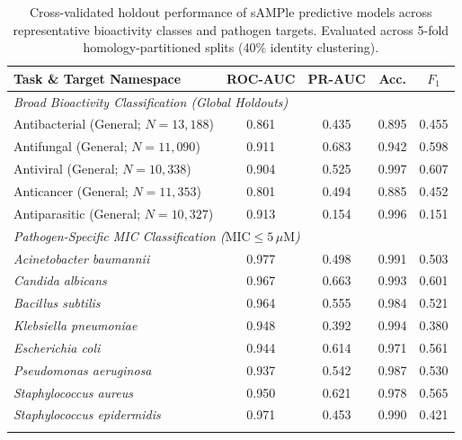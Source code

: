 \documentclass[unnumsec,webpdf,contemporary,large]{oup-authoring-template}%
\begin{document}
\begin{table}[!t]
\caption{Cross-validated holdout performance of sAMPle predictive models across representative bioactivity classes and pathogen targets. Evaluated across 5-fold homology-partitioned splits (40\% identity clustering).}\label{tab:models}
\begin{center}
\footnotesize
\begin{tabular*}{\columnwidth}{@{\extracolsep\fill}lcccc@{\extracolsep\fill}}
\toprule
Task \& Target Namespace & ROC-AUC & PR-AUC & Acc. & $F_1$ \\
\midrule
\multicolumn{5}{l}{\textit{Broad Bioactivity Classification (Global Holdouts)}} \\
Antibacterial (General; $N=13,188$) & 0.861 & 0.435 & 0.895 & 0.455 \\
Antifungal (General; $N=11,090$) & 0.911 & 0.683 & 0.942 & 0.598 \\
Antiviral (General; $N=10,338$) & 0.904 & 0.525 & 0.997 & 0.607 \\
Anticancer (General; $N=11,353$) & 0.801 & 0.494 & 0.885 & 0.452 \\
Antiparasitic (General; $N=10,327$) & 0.913 & 0.154 & 0.996 & 0.151 \\
\midrule
\multicolumn{5}{l}{\textit{Pathogen-Specific MIC Classification ($\text{MIC} \le 5\,\mu\text{M}$)}} \\
\textit{Acinetobacter baumannii} & 0.977 & 0.498 & 0.991 & 0.503 \\
\textit{Candida albicans} & 0.967 & 0.663 & 0.993 & 0.601 \\
\textit{Bacillus subtilis} & 0.964 & 0.555 & 0.984 & 0.521 \\
\textit{Klebsiella pneumoniae} & 0.948 & 0.392 & 0.994 & 0.380 \\
\textit{Escherichia coli} & 0.944 & 0.614 & 0.971 & 0.561 \\
\textit{Pseudomonas aeruginosa} & 0.937 & 0.542 & 0.987 & 0.530 \\
\textit{Staphylococcus aureus} & 0.950 & 0.621 & 0.978 & 0.565 \\
\textit{Staphylococcus epidermidis} & 0.971 & 0.453 & 0.990 & 0.421 \\
\botrule
\end{tabular*}
\end{center}
\end{table}
\end{document}
